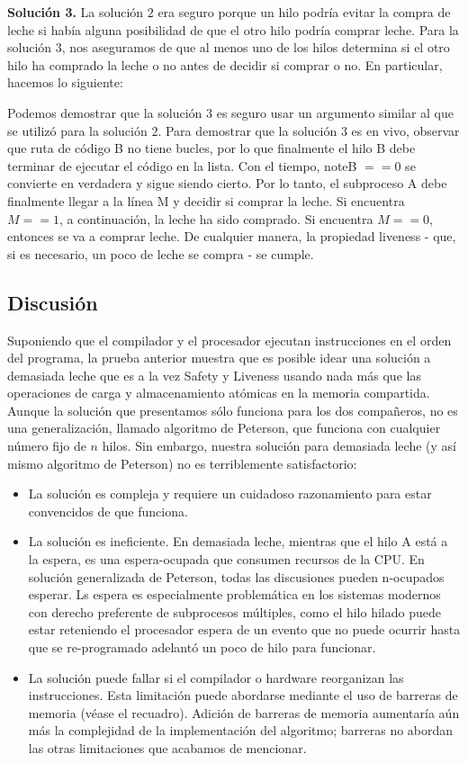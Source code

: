 \documentclass[10pt]{book}
\begin{document}
\textbf{Solución 3.} La solución $2$ era seguro porque un hilo podría evitar la compra de leche si había alguna posibilidad de que el otro hilo podría comprar leche. Para la solución $3$, nos aseguramos de que al menos uno de los hilos determina si el otro hilo ha comprado la leche o no antes de decidir si comprar o no. En particular, hacemos lo siguiente:

Podemos demostrar que la solución $3$ es seguro usar un argumento similar al que se utilizó para la solución $2$. Para demostrar que la solución $3$ es en vivo, observar que ruta de código B no tiene bucles, por lo que finalmente el hilo B debe terminar de ejecutar el código en la lista. Con el tiempo, noteB $== 0$ se convierte en verdadera y sigue siendo cierto. Por lo tanto, el subproceso A debe finalmente llegar a la línea M y decidir si comprar la leche. Si encuentra $M == 1$, a continuación, la leche ha sido comprado. Si encuentra $M == 0$, entonces se va a comprar leche. De cualquier manera, la propiedad liveness - que, si es necesario, un poco de leche se compra - se cumple.

\subsection{Discusión}
Suponiendo que el compilador y el procesador ejecutan instrucciones en el orden del programa, la prueba anterior muestra que es posible idear una solución a demasiada leche que es a la vez Safety y Liveness usando nada más que las operaciones de carga y almacenamiento atómicas en la memoria compartida. Aunque la solución que presentamos sólo funciona para los dos compañeros, no es una generalización, llamado algoritmo de Peterson, que funciona con cualquier número fijo de $n$ hilos. Sin embargo, nuestra solución para demasiada leche (y así mismo algoritmo de Peterson) no es terriblemente satisfactorio:
\begin{itemize}
\item La solución es compleja y requiere un cuidadoso razonamiento para estar convencidos de que funciona.
\item La solución es ineficiente. En demasiada leche, mientras que el hilo A está a la espera, es una espera-ocupada que consumen recursos de la CPU. En solución generalizada de Peterson, todas las discusiones pueden n-ocupados esperar. Ls espera es especialmente problemática en los sistemas modernos con derecho preferente de subprocesos múltiples, como el hilo hilado puede estar reteniendo el procesador espera de un evento que no puede ocurrir hasta que se re-programado adelantó un poco de hilo para funcionar.
\item La solución puede fallar si el compilador o hardware reorganizan las instrucciones. Esta limitación puede abordarse mediante el uso de barreras de memoria (véase el recuadro). Adición de barreras de memoria aumentaría aún más la complejidad de la implementación del algoritmo; barreras no abordan las otras limitaciones que acabamos de mencionar.
\end{itemize}
\end{document}
